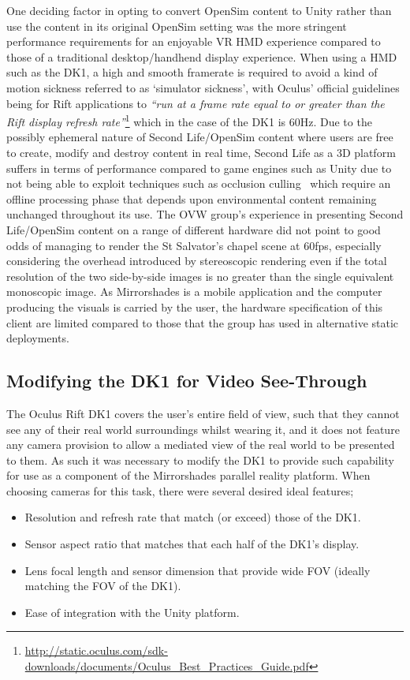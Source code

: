 One deciding factor in opting to convert OpenSim content to Unity rather than use the content in its original OpenSim setting was the more stringent performance requirements for an enjoyable VR HMD experience compared to those of a traditional desktop/handhend display experience. When using a HMD such as the DK1, a high and smooth framerate is required to avoid a kind of motion sickness referred to as `simulator sickness', with Oculus' official guidelines being for Rift applications to \textit{``run at a frame rate equal to or greater than the Rift display refresh rate''}\footnote{\url{http://static.oculus.com/sdk-downloads/documents/Oculus_Best_Practices_Guide.pdf}} which in the case of the DK1 is 60Hz. Due to the possibly ephemeral nature of Second Life/OpenSim content where users are free to create, modify and destroy content in real time, Second Life as a 3D platform suffers in terms of performance compared to game engines such as Unity due to not being able to exploit techniques such as occlusion culling~\cite{willmott:largecomplex} which require an offline processing phase that depends upon environmental content remaining unchanged throughout its use. The OVW group's experience in presenting Second Life/OpenSim content on a range of different hardware did not point to good odds of managing to render the St Salvator's chapel scene at 60fps, especially considering the overhead introduced by stereoscopic rendering even if the total resolution of the two side-by-side images is no greater than the single equivalent monoscopic image. As Mirrorshades is a mobile application and the computer producing the visuals is carried by the user, the hardware specification of this client are limited compared to those that the group has used in alternative static deployments.


\subsection{Modifying the DK1 for Video See-Through}
\label{modifying-dk1}
The Oculus Rift DK1 covers the user's entire field of view, such that they cannot see any of their real world surroundings whilst wearing it, and it does not feature any camera provision to allow a mediated view of the real world to be presented to them. As such it was necessary to modify the DK1 to provide such capability for use as a component of the Mirrorshades parallel reality platform. When choosing cameras for this task, there were several desired ideal features;
\begin{itemize}
	\item Resolution and refresh rate that match (or exceed) those of the DK1.
	\item Sensor aspect ratio that matches that each half of the DK1's display.
	\item Lens focal length and sensor dimension that provide wide FOV (ideally matching the FOV of the DK1).
	\item Ease of integration with the Unity platform.
\end{itemize}

